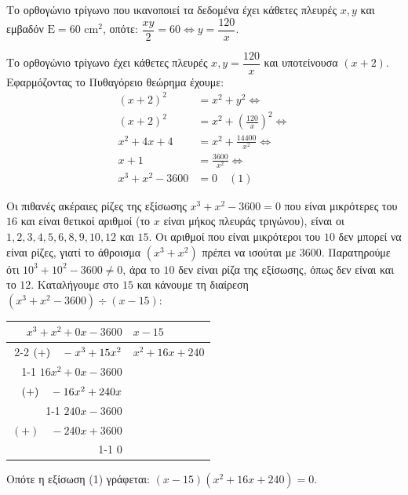 \begin{alist}
\item 
\begin{rlist}
\item Το ορθογώνιο τρίγωνο που ικανοποιεί τα δεδομένα έχει κάθετες πλευρές $x, y$ και εμβαδόν $\text{E} = 60\text{ cm}^2$, οπότε: $\dfrac{xy}{2} = 60 \Leftrightarrow y = \dfrac{120}{x}$.
\item Το ορθογώνιο τρίγωνο έχει κάθετες πλευρές $x, y = \dfrac{120}{x}$ και υποτείνουσα $(x+2)$. \\
Εφαρμόζοντας το Πυθαγόρειο θεώρημα έχουμε:
\begin{align*}
(x+2)^2 &= x^2 + y^2 \Leftrightarrow \\
(x+2)^2 &= x^2 + \left(\frac{120}{x}\right)^2 \Leftrightarrow \\
x^2 + 4x + 4 &= x^2 + \frac{14400}{x^2} \Leftrightarrow \\
x + 1 &= \frac{3600}{x^2} \Leftrightarrow \\
x^3 + x^2 - 3600 &= 0 \quad (1)
\end{align*}
\end{rlist}
\item Οι πιθανές ακέραιες ρίζες της εξίσωσης $x^3 + x^2 - 3600 = 0$ που είναι μικρότερες του $16$ και είναι θετικοί αριθμοί (το $x$ είναι μήκος πλευράς τριγώνου), είναι οι $1,2,3,4,5,6,8,9,10,12$ και $15$. 
Οι αριθμοί που είναι μικρότεροι του $10$ δεν μπορεί να είναι ρίζες, γιατί το άθροισμα $(x^3 + x^2)$ πρέπει να ισούται με $3600$. 
Παρατηρούμε ότι $10^3 + 10^2 - 3600 \ne 0$, άρα το $10$ δεν είναι ρίζα της εξίσωσης, όπως δεν είναι και το $12$. Καταλήγουμε στο $15$ και κάνουμε τη διαίρεση $(x^3 + x^2 - 3600) \div (x - 15)$:
\begin{center}
\begin{tabular}{r|l}
$x^3 + x^2 + 0x - 3600$ & $x - 15$ \\
\cline{2-2}
$(+) \quad -x^3 + 15x^2 \hfill$ & $x^2 + 16x + 240$ \\
\cline{1-1}
$16x^2 + 0x - 3600$ & \\
$(+) \quad -16x^2 + 240x \hfill$ & \\
\cline{1-1}
$240x - 3600$ & \\
$(+) \quad -240x + 3600$ & \\
\cline{1-1}
$0$ &
\end{tabular}
\end{center}
Οπότε η εξίσωση (1) γράφεται: $(x-15)(x^2+16x+240) = 0$.
\end{alist}

